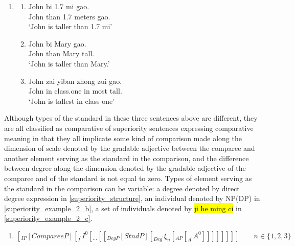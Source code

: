 \documentclass{ctexart}
\begin{document}
\begin{enumerate}
    \item \label{superiority_example_1}
    \begin{enumerate}
        \item \label{superiority_example_1_a}
        John bi 1.7 mi gao. \\
        John than 1.7 meters gao. \\
        `John is taller than 1.7 mi' 

        \item \label{superiority_example_1_b}
        John bi Mary gao. \\
        John than Mary tall. \\
        `John is taller than Mary.' 

        \item \label{superiority_example_1_c}
        John zai yiban zhong zui gao. \\
        John in class.one in most tall. \\
        `John is tallest in class one' 

    \end{enumerate}
\end{enumerate}

Although types of the standard in these three sentences above are different, they are all classified as comparative of superiority sentences expressing comparative meaning in that they all implicate some kind of comparison made along the dimension of scale denoted by the gradable adjective between the comparee and another element serving as the standard in the comparison, and the difference between degree along the dimension denoted by the gradable adjective of the comparee and of the standard is not equal to zero. Types of element serving as the standard in the comparison can be variable: a degree denoted by direct degree expression in \ref{superiority_structure}, an individual denoted by NP(DP) in \ref{superiority_example_2_b}, a set of individuals denoted by \hl{ji he ming ci} in \ref{superiority_example_2_c}.

\begin{enumerate}
    \item \label{superiority_structure}
    $[_{IP} [CompareeP] [_{I^{\prime}} I^{0} [_{...} [[_{DegP} [StndP] [_{Deg^{\prime}} \xi_{n} [_{AP} [_{A^{\prime}} A^{0}]]]]]]]] \qquad n \in \{1, 2, 3\}$
\end{enumerate}
\end{document}
